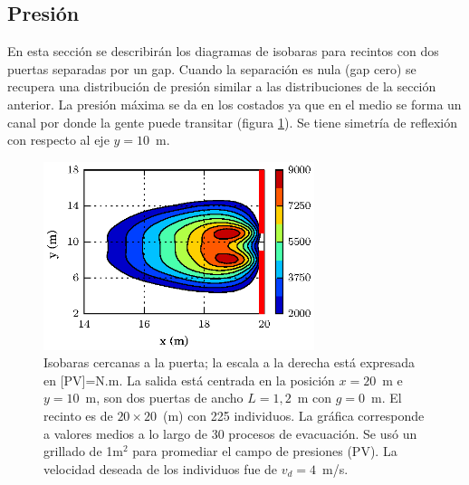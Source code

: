 


\subsection{Presión}

En esta sección se describirán los diagramas de isobaras para recintos con dos puertas separadas por un gap. 
Cuando la separación es nula (gap cero) se recupera una distribución de presión similar a las distribuciones de la sección anterior. La presión máxima se da en los costados ya que en el medio se forma un canal por donde la gente puede transitar (figura \ref{presion_225p_g0}). Se tiene simetría de reflexión con respecto al eje $y=10$~m. 
\begin{figure}[H]
    \centering
    \includegraphics[height=5.5cm]{figuras/press_225p_v4_g0.eps}
    \caption[width=5cm]{Isobaras cercanas a la puerta; la escala a la derecha está expresada en [PV]=N.m. La salida está centrada en la posición $x=20$~m e $y=10$~m, son dos puertas de ancho $L=1,2$~m con $g=0$~m. El recinto es de $20\times 20$~(m) con 225 individuos. La gráfica corresponde a valores medios a lo largo de 30 procesos de evacuación. Se usó un grillado de 1m$^2$ para promediar el campo de presiones (PV). La velocidad deseada de los individuos fue de $v_d=4$~m/s.}
    \label{presion_225p_g0}
\end{figure}

